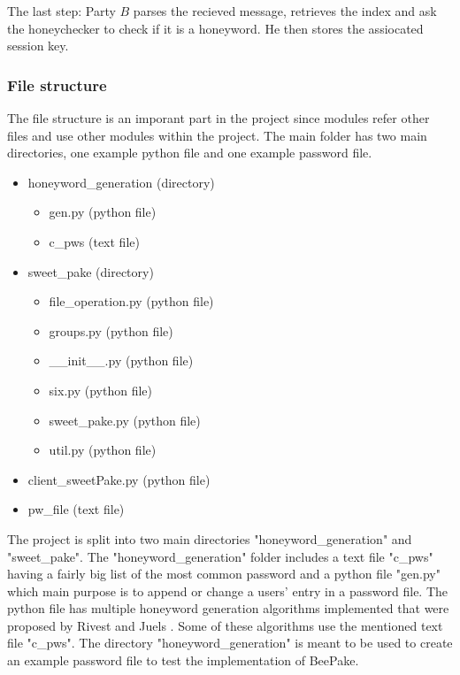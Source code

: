 \documentclass[../main.tex]{subfiles}
\begin{document}
The last step: Party \(B\) parses the recieved message, retrieves the index and
ask the honeychecker to check if it is a honeyword. He then stores the assiocated
session key.

\subsubsection{File structure} 
The file structure is an imporant part in the project since modules refer other files and use
other modules within the project. The main folder has two main directories, one example python
file and one example password file.

\begin{itemize}
	\item honeyword\_generation (directory)
	\begin{itemize}
		\item gen.py (python file)
		\item c\_pws (text file)
	\end{itemize}

	\item sweet\_pake (directory)
	\begin{itemize}
		\item file\_operation.py (python file)
		\item groups.py (python file)
		\item \_\_init\_\_.py (python file)
		\item six.py (python file)
		\item sweet\_pake.py (python file)
		\item util.py (python file)
	\end{itemize}
	\item client\_sweetPake.py (python file)
	\item pw\_file (text file)
\end{itemize}

The project is split into two main directories "honeyword\_generation" and
"sweet\_pake". The "honeyword\_generation" folder includes a text file "c\_pws"
having a fairly big list of the most common password and a python file "gen.py"
which main purpose is to append or change a users' entry in a password file.
The python file has multiple honeyword generation algorithms implemented that
were proposed by Rivest and Juels \cite{juels2013honeywords}. Some of these
algorithms use the mentioned text file "c\_pws". The directory
"honeyword\_generation" is meant to be used to create an example password file
to test the implementation of BeePake.
\end{document}
